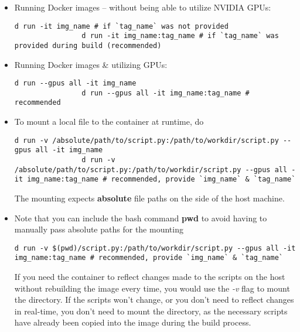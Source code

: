 \documentclass[12pt, a4paper]{article}
\numberwithin{equation}{section}
\theoremstyle{definition}
\theoremstyle{definition}
\begin{document}
		\begin{itemize} 
	
			\item Running Docker images -- without being able to utilize NVIDIA GPUs:
			
			\begin{lstlisting}[style=mystylebash, label=alg:docker_run, xleftmargin=\parindent]
				d run -it img_name # if `tag_name` was not provided
				d run -it img_name:tag_name # if `tag_name` was provided during build (recommended)
			\end{lstlisting}
		
			\item Running Docker images \& utilizing GPUs: 
			
			\begin{lstlisting}[style=mystylebash, label=alg:docker_run_gpus, xleftmargin=\parindent]
				d run --gpus all -it img_name 
				d run --gpus all -it img_name:tag_name # recommended
			\end{lstlisting}
		
			\item To mount a local file to the container at runtime, do
			
			\begin{lstlisting}[style=mystylebash, label=alg:docker__run_volume_mounting, xleftmargin=\parindent]
				d run -v /absolute/path/to/script.py:/path/to/workdir/script.py --gpus all -it img_name 
				d run -v /absolute/path/to/script.py:/path/to/workdir/script.py --gpus all -it img_name:tag_name # recommended, provide `img_name` & `tag_name`
			\end{lstlisting}
		
			The mounting expects \textbf{absolute} file paths on the side of the host machine.
			
			\item Note that you can include the bash command \textbf{pwd} to avoid having to manually pass absolute paths for the mounting
			
			\begin{lstlisting}[style=mystylebash, label=alg:docker_run__with_pwd, xleftmargin=\parindent]
				d run -v $(pwd)/script.py:/path/to/workdir/script.py --gpus all -it img_name:tag_name # recommended, provide `img_name` & `tag_name`
			\end{lstlisting}
		
			If you need the container to reflect changes made to the scripts on the host without rebuilding the image every time, you would use the \textit{-v} flag to mount the directory. If the scripts won't change, or you don't need to reflect changes in real-time, you don't need to mount the directory, as the necessary scripts have already been copied into the image during the build process.
			

\end{itemize}
\end{document}
